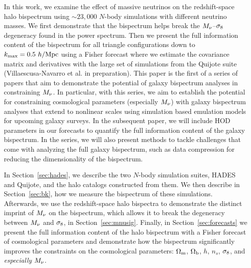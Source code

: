 In this work, we examine the effect of massive neutrinos on the redshift-space 
halo bispectrum using ${\sim}23,000$ $N$-body simulations with different neutrino masses. 
We first demonstrate that the bispectrum helps break the $M_\nu$--$\sigma_8$ degeneracy 
found in the power spectrum. Then we present the full information content of the 
bispectrum for all triangle configurations down to $k_{\rm max} = 0.5~h/{\rm Mpc}$ using 
a Fisher forecast where we estimate the covariance matrix and derivatives with 
the large set of simulations from the Quijote suite (Villaescusa-Navarro et al. in preparation). 
This paper is the first of a series of papers that aim to demonstrate the potential 
of galaxy bispectrum analyses in constraining $M_\nu$. In particular, with this 
series, we aim to establish the potential for constraining cosmological parameters 
(especially $M_\nu$) with galaxy bispectrum analyses that extend to nonlinear scales 
using simulation based emulation models for upcoming galaxy surveys. In the subsequent 
paper, we will include HOD parameters in our forecasts to quantify the full information 
content of the galaxy bispectrum. In the series, we will also present methods to 
tackle challenges that come with analyzing the full galaxy bispectrum, such as data 
compression for reducing the dimensionality of the bispectrum. 

In Section~\ref{sec:hades}, we describe the two $N$-body simulation suites, HADES and Quijote, 
and the halo catalogs constructed from them. We then describe in Section~\ref{sec:bk}, 
how we measure the bispectrum of these simulations. 
Afterwards, we use the redshift-space halo bispectra to demonstrate the distinct imprint of 
$M_\nu$ on the bispectrum, which allows it to break the degeneracy between 
$M_\nu$ and $\sigma_8$, in Section~\ref{sec:mnusig}. Finally, in Section~\ref{sec:forecasts} 
we present the full information content of the halo bispectrum with a Fisher forecast 
of cosmological parameters and demonstrate how the bispectrum significantly improves 
the constraints on the cosmological parameters: $\Omega_{\rm m}$, $\Omega_{\rm b}$, $h$, $n_s$, $\sigma_8$, and {\em especially} $M_\nu$. 

